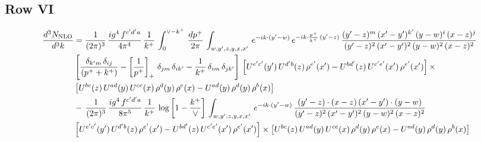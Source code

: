 \documentclass[9pt]{article}
\numberwithin{equation}{section}
\begin{document}
\subsection{Row VI}
\begin{align}
    \frac{d^{3}N_{\rm NLO}}{d^{3}k} & = \frac{1}{(2\pi)^{3}}\, \frac{ig^{4}\,f^{c'd'a}}{4\pi^{4}}\, \frac{1}{k^{+}}\,\int_{0}^{\vee-k^{+}}\, \frac{dp^{+}}{2\pi}\, \int_{w,y',z,y,x,x'}\, e^{-ik\cdot (y'-w)}\, e^{-ik\cdot \frac{p^{+}}{k^{+}}\,(y'-z)}\,\frac{(y'-z)^{m}\,(x'-y')^{k'}\,(y-w)^{i}\,(x-z)^{j}}{(y'-z)^{2}\,(x'-y')^{2}\,(y-w)^{2}\,(x-z)^{2}}\notag \\ & \left[\frac{\delta_{k'm}\,\delta_{ij}}{(p^{+}+k^{+})}-\left[\frac{1}{p^{+}}\right]_{+}\,\delta_{jm}\,\delta_{ik'}-\frac{1}{k^{+}}\, \delta_{im}\, \delta_{jk'}\right]\, \left[U^{e'c'}(y')\,U^{d'b}(z)\,\rho^{e'}(x')-U^{bd'}(z)\,U^{c'e'}(x')\,\rho^{e'}(x')\right]\times\notag \\ &  \left[U^{bc}(z)\,U^{ad}(y)\,U^{ce}(x)\,\rho^{d}(y)\,\rho^{e}(x)-U^{ad}(y)\,\rho^{d}(y)\,\rho^{b}(x)\right]\notag \\ &  -\,\frac{1}{(2\pi)^{3}}\, \frac{ig^{4}\,f^{c'd'a}}{8\pi^{5}}\, \frac{1}{k^{+}}\, \log{\left[1-\frac{k^{+}}{\vee}\right]}\, \int_{w,y',z,y,x,x'}\, e^{-ik\cdot (y'-w)}\,\frac{(y'-z)\cdot (x-z)\,(x'-y')\cdot (y-w)}{(y'-z)^{2}\,(x'-y')^{2}\,(y-w)^{2}\,(x-z)^{2}}\notag \\ & \left[U^{e'c'}(y')\,U^{d'b}(z)\,\rho^{e'}(x')-U^{bd'}(z)\,U^{c'e'}(x')\,\rho^{e'}(x')\right]\times  \left[U^{bc}(z)\,U^{ad}(y)\,U^{ce}(x)\,\rho^{d}(y)\,\rho^{e}(x)-U^{ad}(y)\,\rho^{d}(y)\,\rho^{b}(x)\right]
\end{align}
\end{document}
